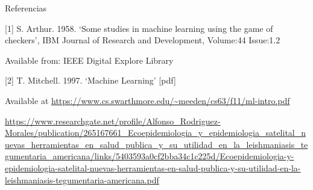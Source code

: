 \documentclass[10pt]{beamer}
\begin{document}
\appendix

\begin{frame}{Referencias}

[1] S. Arthur. 1958. ‘Some studies in machine learning using the game of
checkers', IBM Journal of Research and Development, Volume:44 Issue:1.2

Available from: IEEE Digital Explore Library

[2] T. Mitchell. 1997. ‘Machine Learning’ [pdf]

Available at \url{https://www.cs.swarthmore.edu/~meeden/cs63/f11/ml-intro.pdf}

  \url{https://www.researchgate.net/profile/Alfonso_Rodriguez-Morales/publication/265167661_Ecoepidemiologia_y_epidemiologia_satelital_nuevas_herramientas_en_salud_publica_y_su_utilidad_en_la_leishmaniasis_tegumentaria_americana/links/5403593a0cf2bba34c1c225d/Ecoepidemiologia-y-epidemiologia-satelital-nuevas-herramientas-en-salud-publica-y-su-utilidad-en-la-leishmaniasis-tegumentaria-americana.pdf}

\end{frame}
\end{document}
